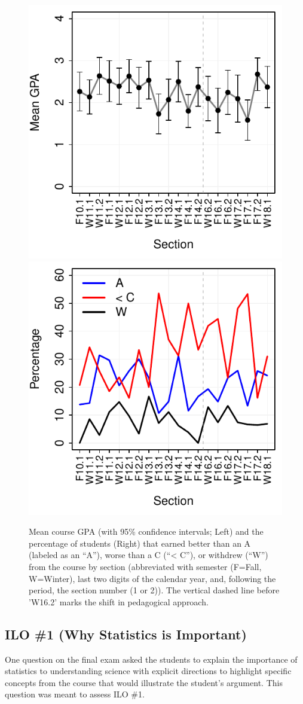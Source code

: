 \documentclass{article}\usepackage[]{graphicx}\usepackage[]{color}
\newenvironment{knitrout}{}{} %
\begin{document}
\begin{knitrout}
\color{fgcolor}\begin{figure}[hbtp]

{\centering \includegraphics[width=.4\linewidth]{Figs/GradeSummary-1} 
\includegraphics[width=.4\linewidth]{Figs/GradeSummary-2} 

}

\caption[Mean course GPA (with 95\% confidence intervals]{Mean course GPA (with 95\% confidence intervals; Left) and the percentage of students (Right) that earned better than an A (labeled as an ``A''), worse than a C (``< C''), or withdrew (``W'') from the course by section (abbreviated with semester (F=Fall, W=Winter), last two digits of the calendar year, and, following the period, the section number (1 or 2)). The vertical dashed line before 'W16.2' marks the shift in pedagogical approach.}\label{fig:GradeSummary}
\end{figure}


\end{knitrout}


\clearpage
\subsection{ILO \#1 (Why Statistics is Important)}
One question on the final exam asked the students to explain the importance of statistics to understanding science with explicit directions to highlight specific concepts from the course that would illustrate the student's argument. This question was meant to assess ILO \#1.
\end{document}
